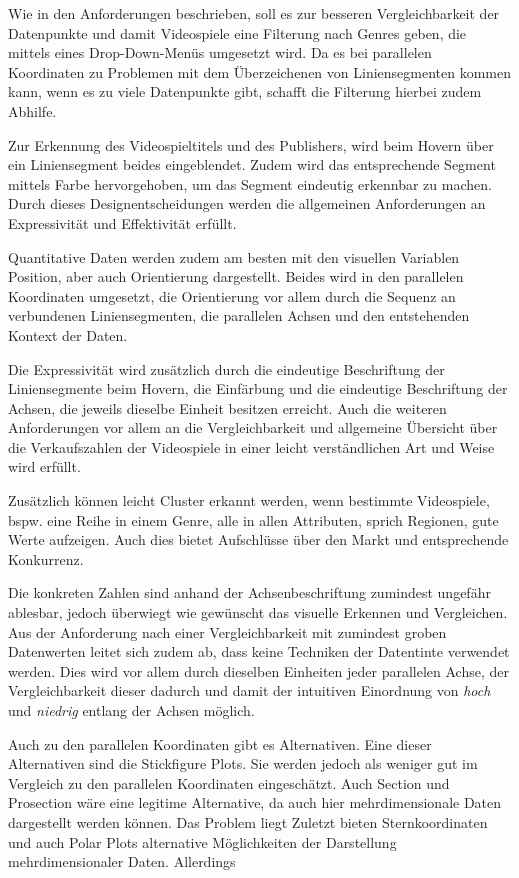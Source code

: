 \documentclass[usegeometry=true]{scrartcl}
\begin{document}
Wie in den Anforderungen beschrieben, soll es zur besseren Vergleichbarkeit der Datenpunkte und damit Videospiele eine Filterung nach Genres geben, die mittels eines Drop-Down-Menüs umgesetzt wird. 
Da es bei parallelen Koordinaten zu Problemen mit dem Überzeichenen von Liniensegmenten kommen kann, wenn es zu viele Datenpunkte gibt, schafft die Filterung hierbei zudem Abhilfe. 

Zur Erkennung des Videospieltitels und des Publishers, wird beim Hovern über ein Liniensegment beides eingeblendet. 
Zudem wird das entsprechende Segment mittels Farbe hervorgehoben, um das Segment eindeutig erkennbar zu machen.
Durch dieses Designentscheidungen werden die allgemeinen Anforderungen an Expressivität und Effektivität erfüllt. 

Quantitative Daten werden zudem am besten mit den visuellen Variablen Position, aber auch Orientierung dargestellt. %
Beides wird in den parallelen Koordinaten umgesetzt, die Orientierung vor allem durch die Sequenz an verbundenen Liniensegmenten, die parallelen Achsen und den entstehenden Kontext der Daten. 

Die Expressivität wird zusätzlich durch die eindeutige Beschriftung der Liniensegmente beim Hovern, die Einfärbung und die eindeutige Beschriftung der Achsen, die jeweils dieselbe Einheit besitzen erreicht. 
Auch die weiteren Anforderungen vor allem an die Vergleichbarkeit und allgemeine Übersicht über die Verkaufszahlen der Videospiele in einer leicht verständlichen Art und Weise wird erfüllt.

Zusätzlich können leicht Cluster erkannt werden, wenn bestimmte Videospiele, bspw. eine Reihe in einem Genre, alle in allen Attributen, sprich Regionen, gute Werte aufzeigen. 
Auch dies bietet Aufschlüsse über den Markt und entsprechende Konkurrenz.

Die konkreten Zahlen sind anhand der Achsenbeschriftung zumindest ungefähr ablesbar, jedoch überwiegt wie gewünscht das visuelle Erkennen und Vergleichen. Aus der Anforderung nach einer Vergleichbarkeit mit zumindest groben Datenwerten leitet sich zudem ab, dass keine Techniken der Datentinte verwendet werden.
Dies wird vor allem durch dieselben Einheiten jeder parallelen Achse, der Vergleichbarkeit dieser dadurch und damit der intuitiven Einordnung von \textit{hoch} und \textit{niedrig} entlang der Achsen möglich.

Auch zu den parallelen Koordinaten gibt es Alternativen. 
Eine dieser Alternativen sind die Stickfigure Plots. Sie werden jedoch als weniger gut im Vergleich zu den parallelen Koordinaten eingeschätzt.
Auch Section und Prosection wäre eine legitime Alternative, da auch hier mehrdimensionale Daten dargestellt werden können. Das Problem liegt 
Zuletzt bieten Sternkoordinaten und auch Polar Plots alternative Möglichkeiten der Darstellung mehrdimensionaler Daten. Allerdings
\end{document}
